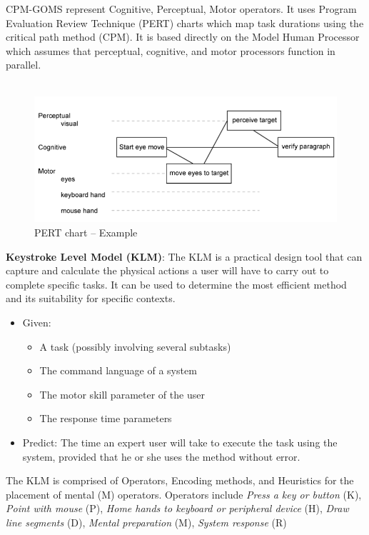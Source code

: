 CPM-GOMS represent Cognitive, Perceptual, Motor operators. It uses Program Evaluation Review Technique (PERT) charts which map task durations using the critical path method (CPM). It is based directly on the Model Human Processor which assumes that perceptual, cognitive, and motor processors function in parallel.\\\\
\begin{figure}[h!]
	\centering
	\includegraphics[width=.5\textwidth]{img/ch05_pert.png}
	\caption{PERT chart -- Example}
	\label{pert}
\end{figure}
\textbf{Keystroke Level Model (KLM)}: The KLM is a practical design tool that can capture and calculate the physical actions a user will have to carry out to complete specific tasks. It can be used to determine the most efficient method and its suitability for specific contexts. 
\begin{itemize}
\item Given:
\begin{itemize}
\item A task (possibly involving several subtasks)
\item The command language of a system
\item The motor skill parameter of the user
\item The response time parameters
\end{itemize}
\item Predict: The time an expert user will take to execute the task using the system, provided that he or she uses the method without error.
\end{itemize}
The KLM is comprised of Operators, Encoding methods, and Heuristics for the placement of mental (M) operators. Operators include \textit{Press a key or button} (K), \textit{Point with mouse} (P), \textit{Home hands to keyboard or peripheral device} (H), \textit{Draw line segments} (D), \textit{Mental preparation} (M), \textit{System response} (R)